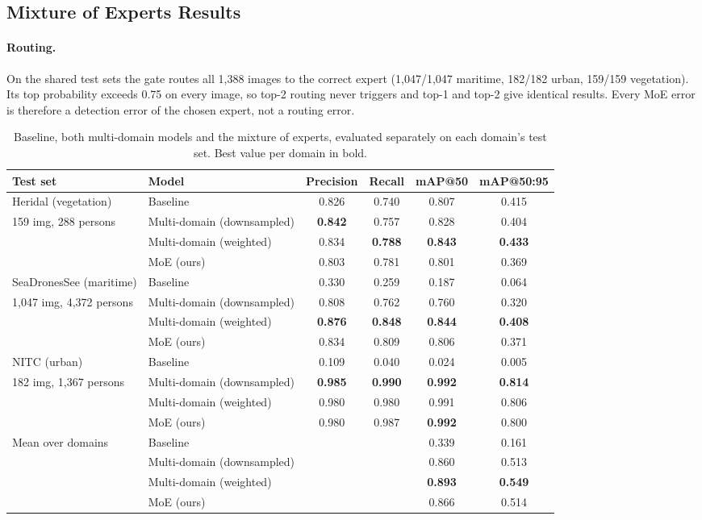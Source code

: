\documentclass{article}
\begin{document}
\subsection{Mixture of Experts Results}
\label{sec:moe_results}

\paragraph{Routing.} On the shared test sets the gate routes all 1,388 images to the correct expert (1,047/1,047 maritime, 182/182 urban, 159/159 vegetation). Its top probability exceeds 0.75 on every image, so top-2 routing never triggers and top-1 and top-2 give identical results. Every MoE error is therefore a detection error of the chosen expert, not a routing error.

\begin{table}[h]
  \caption{Baseline, both multi-domain models and the mixture of experts, evaluated separately on each domain's test set. Best value per domain in bold.}
  \label{tab:moe}
  \centering
  \small
  \begin{tabular}{llcccc}
    \toprule
    Test set & Model & Precision & Recall & mAP@50 & mAP@50:95 \\
    \midrule
    Heridal (vegetation) & Baseline & 0.826 & 0.740 & 0.807 & 0.415 \\
    {\footnotesize 159 img, 288 persons} & Multi-domain (downsampled) & \textbf{0.842} & 0.757 & 0.828 & 0.404 \\
     & Multi-domain (weighted) & 0.834 & \textbf{0.788} & \textbf{0.843} & \textbf{0.433} \\
     & MoE (ours) & 0.803 & 0.781 & 0.801 & 0.369 \\
    \midrule
    SeaDronesSee (maritime) & Baseline & 0.330 & 0.259 & 0.187 & 0.064 \\
    {\footnotesize 1,047 img, 4,372 persons} & Multi-domain (downsampled) & 0.808 & 0.762 & 0.760 & 0.320 \\
     & Multi-domain (weighted) & \textbf{0.876} & \textbf{0.848} & \textbf{0.844} & \textbf{0.408} \\
     & MoE (ours) & 0.834 & 0.809 & 0.806 & 0.371 \\
    \midrule
    NITC (urban) & Baseline & 0.109 & 0.040 & 0.024 & 0.005 \\
    {\footnotesize 182 img, 1,367 persons} & Multi-domain (downsampled) & \textbf{0.985} & \textbf{0.990} & \textbf{0.992} & \textbf{0.814} \\
     & Multi-domain (weighted) & 0.980 & 0.980 & 0.991 & 0.806 \\
     & MoE (ours) & 0.980 & 0.987 & \textbf{0.992} & 0.800 \\
    \midrule
    Mean over domains & Baseline & & & 0.339 & 0.161 \\
     & Multi-domain (downsampled) & & & 0.860 & 0.513 \\
     & Multi-domain (weighted) & & & \textbf{0.893} & \textbf{0.549} \\
     & MoE (ours) & & & 0.866 & 0.514 \\
    \bottomrule
  \end{tabular}
\end{table}
\end{document}
